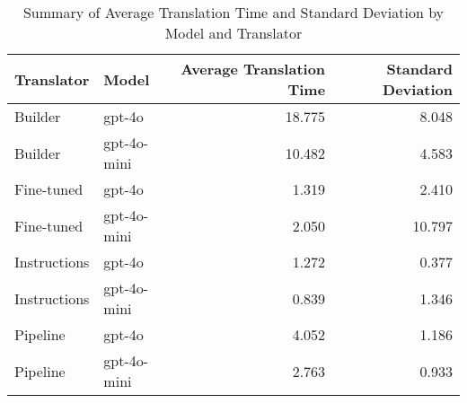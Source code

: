 \begin{table}
\caption{Summary of Average Translation Time and Standard Deviation by Model and Translator}
\label{tab:average_translation_time_summary}
\begin{tabular}{llrr}
\toprule
Translator & Model & Average Translation Time & Standard Deviation \\
\midrule
Builder & gpt-4o & 18.775 & 8.048 \\
Builder & gpt-4o-mini & 10.482 & 4.583 \\
Fine-tuned & gpt-4o & 1.319 & 2.410 \\
Fine-tuned & gpt-4o-mini & 2.050 & 10.797 \\
Instructions & gpt-4o & 1.272 & 0.377 \\
Instructions & gpt-4o-mini & 0.839 & 1.346 \\
Pipeline & gpt-4o & 4.052 & 1.186 \\
Pipeline & gpt-4o-mini & 2.763 & 0.933 \\
\bottomrule
\end{tabular}
\end{table}
